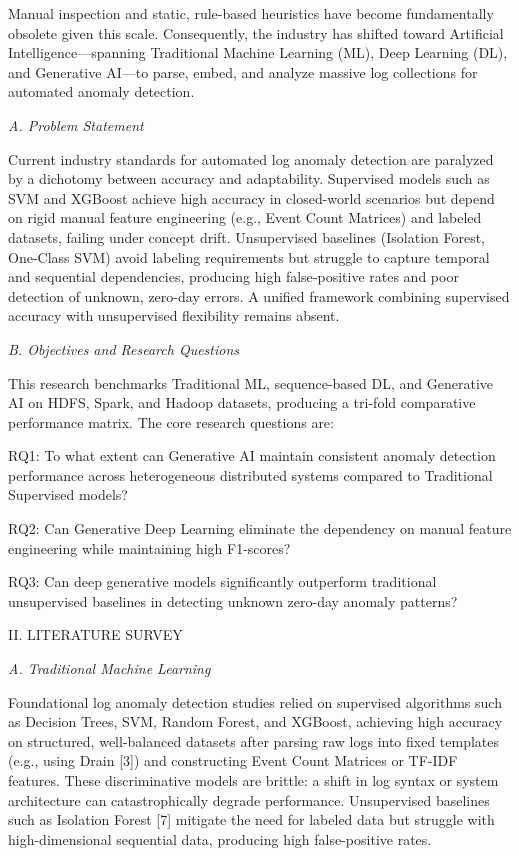 \documentclass[
  11pt,
]{article}
\begin{document}
Manual inspection and static, rule-based heuristics have become
fundamentally obsolete given this scale. Consequently, the industry has
shifted toward Artificial Intelligence---spanning Traditional Machine
Learning (ML), Deep Learning (DL), and Generative AI---to parse, embed,
and analyze massive log collections for automated anomaly detection.

\emph{A. Problem Statement}

Current industry standards for automated log anomaly detection are
paralyzed by a dichotomy between accuracy and adaptability. Supervised
models such as SVM and XGBoost achieve high accuracy in closed-world
scenarios but depend on rigid manual feature engineering (e.g., Event
Count Matrices) and labeled datasets, failing under concept drift.
Unsupervised baselines (Isolation Forest, One-Class SVM) avoid labeling
requirements but struggle to capture temporal and sequential
dependencies, producing high false-positive rates and poor detection of
unknown, zero-day errors. A unified framework combining supervised
accuracy with unsupervised flexibility remains absent.

\emph{B. Objectives and Research Questions}

This research benchmarks Traditional ML, sequence-based DL, and
Generative AI on HDFS, Spark, and Hadoop datasets, producing a tri-fold
comparative performance matrix. The core research questions are:

RQ1: To what extent can Generative AI maintain consistent anomaly
detection performance across heterogeneous distributed systems compared
to Traditional Supervised models?

RQ2: Can Generative Deep Learning eliminate the dependency on manual
feature engineering while maintaining high F1-scores?

RQ3: Can deep generative models significantly outperform traditional
unsupervised baselines in detecting unknown zero-day anomaly patterns?

\textsc{II. LITERATURE SURVEY}

\emph{A. Traditional Machine Learning}

Foundational log anomaly detection studies relied on supervised
algorithms such as Decision Trees, SVM, Random Forest, and XGBoost,
achieving high accuracy on structured, well-balanced datasets after
parsing raw logs into fixed templates (e.g., using Drain {[}3{]}) and
constructing Event Count Matrices or TF-IDF features. These
discriminative models are brittle: a shift in log syntax or system
architecture can catastrophically degrade performance. Unsupervised
baselines such as Isolation Forest {[}7{]} mitigate the need for labeled
data but struggle with high-dimensional sequential data, producing high
false-positive rates.
\end{document}
